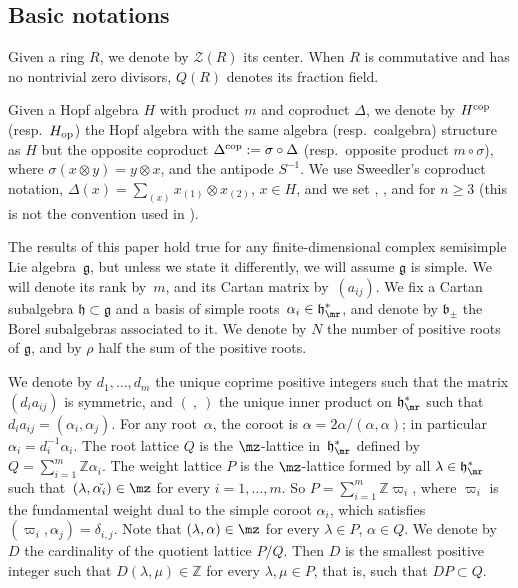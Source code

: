 \subsection{Basic notations} Given a ring $R$, we denote by $\mathcal{Z}(R)$ its center. When $R$ is commutative and has no nontrivial zero divisors, $Q(R)$ denotes its fraction field.

Given a Hopf algebra $H$ with product $m$ and coproduct $\Delta$, we denote by $H^{\rm cop}$ (resp.~$H_{\rm op}$) the Hopf algebra with the same algebra (resp.\ coalgebra) structure as $H$ but the opposite coproduct $\Delta^{\rm cop}:=\sigma \circ {\Delta}$ (resp.\ opposite product $m\circ \sigma$), where $\sigma(x\otimes y) = y\otimes x$, and the antipode ${S}^{-1}$. We use Sweedler's coproduct notation, $ \Delta(x) = \sum_{(x)}x_{(1)} \otimes x_{(2)}$, $x\in H$, and we set , , and  for $n\geq 3$ (this is not the convention used in \cite{BR}).

The results of this paper hold true for any finite-dimensional complex semisimple Lie algebra~${\mathfrak g}$, but unless we state it differently, we will assume ${\mathfrak g}$ is simple. We will denote its rank by~$m$, and its Cartan matrix by~$(a_{ij})$. We fix a Cartan subalgebra $\mathfrak{h}\subset {\mathfrak g}$ and a basis of simple roots~${\alpha_i \in \mathfrak{h}_{\mr}^{*}}$, and denote by $\mathfrak{b}_\pm$ the Borel subalgebras associated to it. We denote by $N$ the number of positive roots of ${\mathfrak g}$, and by $\rho$ half the sum of the positive roots.

We denote by $d_1,\dots , d_m$ the unique coprime positive integers such that the matrix $(d_ia_{ij})$ is symmetric, and $(\ ,\ )$ the unique inner product on $\mathfrak{h}_{\mr}^{*}$ such that $d_ia_{ij} = (\alpha_i,\alpha_j)$. For any root~$\alpha$, the coroot is $\alpha\check{}=2\alpha/(\alpha,\alpha)$; in particular $\alpha\check{}_i=d_i^{-1}\alpha_i$. The root lattice $Q$ is the $\mz$-lattice in~$\mathfrak{h}_{\mr}^{*}$ defined by $ Q = \sum_{i=1}^m \mathbb{Z} \alpha_i$. The weight lattice $P$ is the $\mz$-lattice formed by all $\lambda\in \mathfrak{h}_{\mr}^{*}$ such that~${(\lambda ,\alpha\check{}_i) \in \mz}$ for every $i=1,\dots,m$. So $ P= \sum_{i=1}^m \mathbb{Z} \varpi_i$, where $\varpi_i$ is the fundamental weight dual to the simple coroot $\alpha\check{}_i$, which satisfies $( \varpi_i,\alpha\check{}_j) = \delta_{i,j}$. Note that $(\lambda,\alpha)\in \mz$ for every $\lambda\in P$, $\alpha\in Q$. We denote by $D$ the cardinality of the quotient lattice $P/Q$. Then $D$ is the smallest positive integer such that $D(\lambda,\mu)\in {\mathbb Z}$ for every $\lambda,\mu\in P$, that is, such that $DP\subset Q$.

